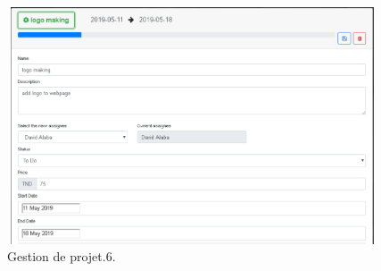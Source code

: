 \FloatBarrier
\begin{figure}[H]
\center
\includegraphics[width=11cm,height=7cm]{./figures/pres/gp6.png}
\caption{Gestion de projet.6.}
\end{figure}
\FloatBarrier 
